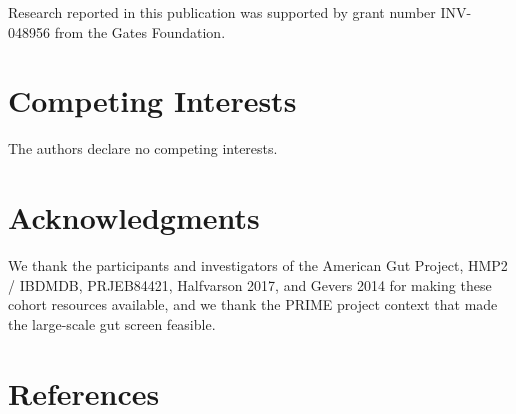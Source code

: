 \documentclass[
  11pt,
]{article}
\newcommand{\paperfundingnote}{Research reported in this publication was supported by grant number INV-048956 from the Gates Foundation.}
\begin{document}
\paperfundingnote

\section{Competing Interests}\label{competing-interests}

The authors declare no competing interests.

\section{Acknowledgments}\label{acknowledgments}

We thank the participants and investigators of the American Gut Project,
HMP2 / IBDMDB, PRJEB84421, Halfvarson 2017, and Gevers 2014 for making
these cohort resources available, and we thank the PRIME project context
that made the large-scale gut screen feasible.

\section*{References}\label{references}
\end{document}
